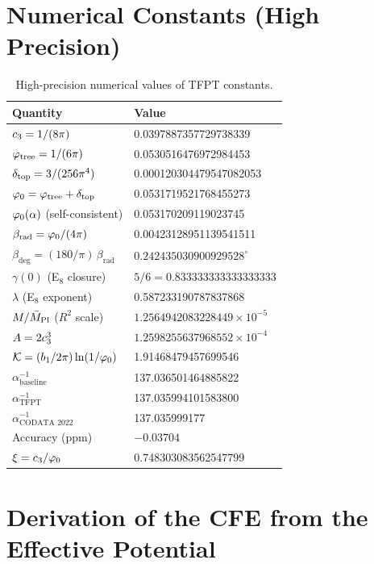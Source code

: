 \section{Numerical Constants (High Precision)}

\begin{table}[H]
\centering
\begin{tabular}{@{}ll@{}}
\toprule
\textbf{Quantity} & \textbf{Value}\\
\midrule
$c_3 = 1/(8\pi)$ & 0.0397887357729738339\\
$\varphi_{\mathrm{tree}} = 1/(6\pi)$ & 0.0530516476972984453\\
$\delta_{\mathrm{top}} = 3/(256\pi^4)$ & 0.000120304479547082053\\
$\varphi_0 = \varphi_{\mathrm{tree}} + \delta_{\mathrm{top}}$ & 0.0531719521768455273\\
$\varphi_0(\alpha)$ (self-consistent) & 0.053170209119023745\\
$\beta_{\text{rad}} = \varphi_0/(4\pi)$ & 0.00423128951139541511\\
$\beta_{\text{deg}} = (180/\pi)\,\beta_{\text{rad}}$ & $0.242435030900929528^\circ$\\
$\gamma(0)$ (E$_8$ closure) & $5/6 = 0.833333333333333333$\\
$\lambda$ (E$_8$ exponent) & 0.587233190787837868\\
$M/\bar{M}_{\mathrm{Pl}}$ ($R^2$ scale) & $1.2564942083228449\times 10^{-5}$\\
$A = 2c_3^3$ & $1.2598255637968552 \times 10^{-4}$\\
$\mathcal{K} = (b_1/2\pi)\ln(1/\varphi_0)$ & 1.91468479457699546\\
$\alpha^{-1}_{\text{baseline}}$ & 137.036501464885822\\
$\alpha^{-1}_{\text{TFPT}}$ & 137.035994101583800\\
$\alpha^{-1}_{\text{CODATA 2022}}$ & 137.035999177\\
Accuracy (ppm) & $-0.03704$\\
$\xi = c_3/\varphi_0$ & 0.748303083562547799\\
\bottomrule
\end{tabular}
\caption{High-precision numerical values of TFPT constants.}
\label{tab:constants}
\end{table}

\section{Derivation of the CFE from the Effective Potential}

